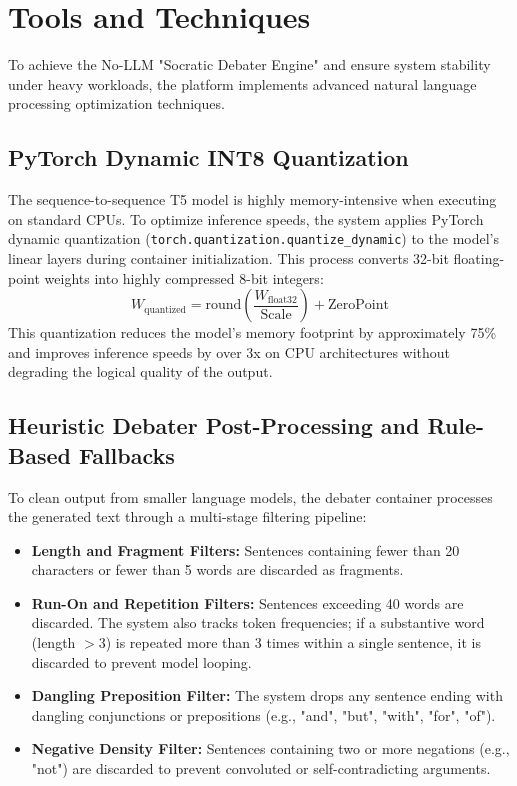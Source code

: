 \section{Tools and Techniques}
To achieve the No-LLM "Socratic Debater Engine" and ensure system stability under heavy workloads, the platform implements advanced natural language processing optimization techniques.

\subsection{PyTorch Dynamic INT8 Quantization}
The sequence-to-sequence T5 model is highly memory-intensive when executing on standard CPUs. To optimize inference speeds, the system applies PyTorch dynamic quantization (\texttt{torch.quantization.quantize\_dynamic}) to the model's linear layers during container initialization. This process converts 32-bit floating-point weights into highly compressed 8-bit integers:
\begin{equation}
    W_{\text{quantized}} = \text{round}\left( \frac{W_{\text{float32}}}{\text{Scale}} \right) + \text{ZeroPoint}
\end{equation}
This quantization reduces the model's memory footprint by approximately 75\% and improves inference speeds by over 3x on CPU architectures without degrading the logical quality of the output.

\subsection{Heuristic Debater Post-Processing and Rule-Based Fallbacks}
To clean output from smaller language models, the debater container processes the generated text through a multi-stage filtering pipeline:
\begin{itemize}
    \item \textbf{Length and Fragment Filters:} Sentences containing fewer than 20 characters or fewer than 5 words are discarded as fragments.
    \item \textbf{Run-On and Repetition Filters:} Sentences exceeding 40 words are discarded. The system also tracks token frequencies; if a substantive word (length $> 3$) is repeated more than 3 times within a single sentence, it is discarded to prevent model looping.
    \item \textbf{Dangling Preposition Filter:} The system drops any sentence ending with dangling conjunctions or prepositions (e.g., "and", "but", "with", "for", "of").
    \item \textbf{Negative Density Filter:} Sentences containing two or more negations (e.g., "not") are discarded to prevent convoluted or self-contradicting arguments.
\end{itemize}

